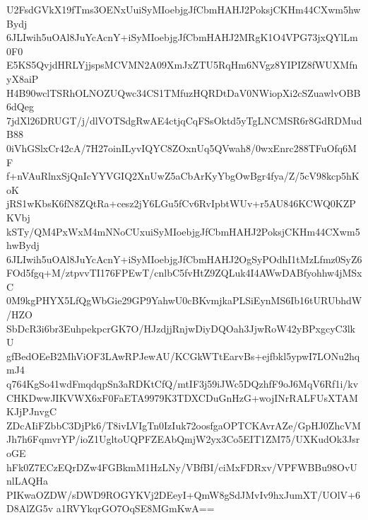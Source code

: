 U2FsdGVkX19fTms3OENxUuiSyMIoebjgJfCbmHAHJ2PoksjCKHm44CXwm5hwBydj
6JLIwih5uOAl8JuYcAcnY+iSyMIoebjgJfCbmHAHJ2MRgK1O4VPG73jxQYlLm0F0
E5KS5QvjdHRLYjjspsMCVMN2A09XmJxZTU5RqHm6NVgz8YIPIZ8fWUXMfnyX8aiP
H4B90wclTSRhOLNOZUQwc34CS1TMfuzHQRDtDaV0NWiopXi2cSZuawlvOBB6dQeg
7jdXl26DRUGT/j/dlVOTSdgRwAE4ctjqCqFSsOktd5yTgLNCMSR6r8GdRDMudB88
0iVhGSlxCr42cA/7H27oinILyvIQYC8ZOxnUq5QVwah8/0wxEnrc288TFuOfq6MF
f+nVAuRlnxSjQnIcYYVGIQ2XnUwZ5aCbArKyYbgOwBgr4fya/Z/5cV98kcp5hKoK
jRS1wKbsK6fN8ZQtRa+cesz2jY6LGu5fCv6RvIpbtWUv+r5AU846KCWQ0KZPKVbj
kSTy/QM4PxWxM4mNNoCUxuiSyMIoebjgJfCbmHAHJ2PoksjCKHm44CXwm5hwBydj
6JLIwih5uOAl8JuYcAcnY+iSyMIoebjgJfCbmHAHJ2OgSyPOdhI1tMzLfmz0SyZ6
FOd5fgq+M/ztpvvTI176FPEwT/cnlbC5fvHtZ9ZQLuk4I4AWwDABfyohhw4jMSxC
0M9kgPHYX5LfQgWbGie29GP9YahwU0cBKvmjkaPLSiEynMS6Ib16tURUbhdW/HZO
SbDcR3i6br3EuhpekpcrGK7O/HJzdjjRnjwDiyDQOah3JjwRoW42yBPxgcyC3lkU
gfBedOEeB2MhViOF3LAwRPJewAU/KCGkWTtEarvBs+ejfbkl5ypwI7LONu2hqmJ4
q764KgSo41wdFmqdqpSn3aRDKtCfQ/mtIF3j59iJWc5DQzhfF9oJ6MqV6Rf1i/kv
CHKDwwJIKVWX6xF0FaETA9979K3TDXCDuGnHzG+wojINrRALFUsXTAMKJjPJnvgC
ZDcAIiFZbbC3DjPk6/T8ivLVIgTn0IzIuk72oosfgaOPTCKAvrAZe/GpHJ0ZhcVM
Jh7h6FqmvrYP/ioZ1UgltoUQPFZEAbQmjW2yx3Co5EIT1ZM75/UXKudOk3JsroGE
hFk0Z7ECzEQrDZw4FGBkmM1HzLNy/VBfBI/ciMxFDRxv/VPFWBBu98OvUnlLAQHa
PIKwaOZDW/sDWD9ROGYKVj2DEeyI+QmW8gSdJMvIv9hxJumXT/UOlV+6D8AlZG5v
a1RVYkqrGO7OqSE8MGmKwA==

